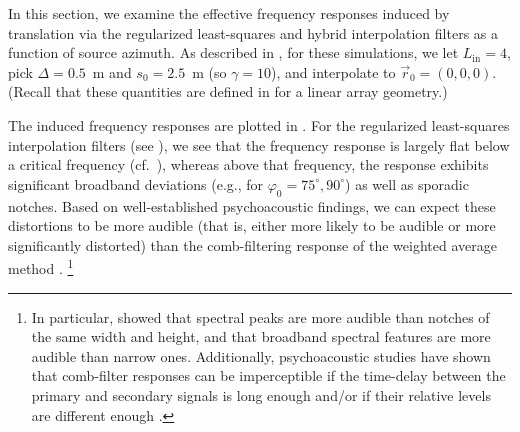 In this section, we examine the effective frequency responses induced by translation via the regularized least-squares and hybrid interpolation filters as a function of source azimuth.
As described in , for these simulations, we let $L_\text{in} = 4$, pick $\Delta = 0.5$~m and $s_0 = 2.5$~m (so $\gamma = 10$), and interpolate to $\vec{r}_0 = (0, 0, 0)$.
(Recall that these quantities are defined in  for a linear array geometry.)

The induced frequency responses are plotted in .
For the regularized least-squares interpolation filters (see ), we see that the frequency response is largely flat below a critical frequency (cf.~\citet[Fig.~4b]{TylkaChoueiri2016}), whereas above that frequency, the response exhibits significant broadband deviations (e.g., for $\varphi_0 = 75^\circ, 90^\circ$) as well as sporadic notches.
Based on well-established psychoacoustic findings, we can expect these distortions to be more audible (that is, either more likely to be audible or more significantly distorted) than the comb-filtering response of the weighted average method \citep{Bucklein1981,Kates1984,Brunner2007}.%
\footnote{In particular, \citet{Bucklein1981} showed that spectral peaks are more audible than notches of the same width and height, and that broadband spectral features are more audible than narrow ones.
Additionally, psychoacoustic studies have shown that comb-filter responses can be imperceptible if the time-delay between the primary and secondary signals is long enough and/or if their relative levels are different enough \citep{Kates1984,Brunner2007}.}

